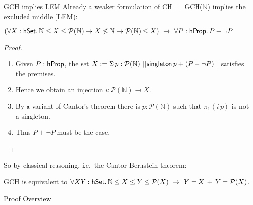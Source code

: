 \documentclass[xcolor=dvipsnames,compress,aspectratio=169,handout]{beamer}
\newcommand{\MBB}[1]{\ensuremath{\mathbb{#1}}\xspace}  %
\newcommand{\MCL}[1]{\ensuremath{\mathcal{#1}}\xspace} %
\newcommand{\Nat}{\MBB{N}}   %
\newcommand{\Pow}{\MCL P}
\begin{document}
\begin{frame}{GCH implies LEM}
	Already a weaker formulation of CH$~=~$GCH($\Nat$) implies the excluded middle (LEM):
	\begin{fact}
		$(\forall X:\hset.\,\Nat \le X\le \Pow(\Nat)\to X\not\le \Nat\to \Pow(\Nat)\le X)~\to~\forall P:\hprop.\,P+\neg P$
	\end{fact}
	\pause
	\begin{proof}
		\begin{enumerate}
			\pause
			\item
			Given $P:\mathsf{hProp}$, the set $X:=\Sigma\, p:\Pow(\Nat).\,\trunc{\mathsf{singleton}\,p+ (P+\neg P)}$ satisfies the premises.
			\pause
			\item
			Hence we obtain an injection $i:\Pow(\Nat)\to X$.
			\pause
			\item
			By a variant of Cantor's theorem there is $p:\Pow(\Nat)$ such that $\pi_1(i\,p)$ is not a singleton.
			\pause
			\item
			Thus $P+\neg P$ must be the case.
			\qedhere
		\end{enumerate}
	\end{proof}
	\pause
	So by classical reasoning, i.e.\ the Cantor-Bernstein theorem:
	\begin{corollary}
		GCH is equivalent to $\forall X Y:\hset.\,\Nat \le X\le Y\le \Pow(X)~\to~ Y = X \,+\, Y=\Pow(X) $.
	\end{corollary}
\end{frame}

\begin{frame}
	\Huge
	\centering
	Proof Overview
\end{frame}
\end{document}
